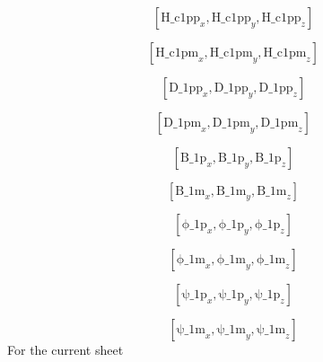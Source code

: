 \documentclass[fleqn]{article}
\begin{document}
\[\tag{\% o310} 
\left[ {{\ensuremath{\mathrm{H\_ c1pp}}}_x}\operatorname{,}{{\ensuremath{\mathrm{H\_ c1pp}}}_y}\operatorname{,}{{\ensuremath{\mathrm{H\_ c1pp}}}_z}\right] \mbox{}\]

\[\tag{\% o311} 
\left[ {{\ensuremath{\mathrm{H\_ c1pm}}}_x}\operatorname{,}{{\ensuremath{\mathrm{H\_ c1pm}}}_y}\operatorname{,}{{\ensuremath{\mathrm{H\_ c1pm}}}_z}\right] \mbox{}\]

\[\tag{\% o312} 
\left[ {{\ensuremath{\mathrm{D\_ 1pp}}}_x}\operatorname{,}{{\ensuremath{\mathrm{D\_ 1pp}}}_y}\operatorname{,}{{\ensuremath{\mathrm{D\_ 1pp}}}_z}\right] \mbox{}\]

\[\tag{\% o313} 
\left[ {{\ensuremath{\mathrm{D\_ 1pm}}}_x}\operatorname{,}{{\ensuremath{\mathrm{D\_ 1pm}}}_y}\operatorname{,}{{\ensuremath{\mathrm{D\_ 1pm}}}_z}\right] \mbox{}\]

\[\tag{\% o314} 
\left[ {{\ensuremath{\mathrm{B\_ 1p}}}_x}\operatorname{,}{{\ensuremath{\mathrm{B\_ 1p}}}_y}\operatorname{,}{{\ensuremath{\mathrm{B\_ 1p}}}_z}\right] \mbox{}\]

\[\tag{\% o315} 
\left[ {{\ensuremath{\mathrm{B\_ 1m}}}_x}\operatorname{,}{{\ensuremath{\mathrm{B\_ 1m}}}_y}\operatorname{,}{{\ensuremath{\mathrm{B\_ 1m}}}_z}\right] \mbox{}\]

\[\tag{\% o316} 
\left[ {{\ensuremath{\mathrm{\phi \_ 1p}}}_x}\operatorname{,}{{\ensuremath{\mathrm{\phi \_ 1p}}}_y}\operatorname{,}{{\ensuremath{\mathrm{\phi \_ 1p}}}_z}\right] \mbox{}\]

\[\tag{\% o317} 
\left[ {{\ensuremath{\mathrm{\phi \_ 1m}}}_x}\operatorname{,}{{\ensuremath{\mathrm{\phi \_ 1m}}}_y}\operatorname{,}{{\ensuremath{\mathrm{\phi \_ 1m}}}_z}\right] \mbox{}\]

\[\tag{\% o318} 
\left[ {{\ensuremath{\mathrm{\psi \_ 1p}}}_x}\operatorname{,}{{\ensuremath{\mathrm{\psi \_ 1p}}}_y}\operatorname{,}{{\ensuremath{\mathrm{\psi \_ 1p}}}_z}\right] \mbox{}\]

\[\tag{\% o319} 
\left[ {{\ensuremath{\mathrm{\psi \_ 1m}}}_x}\operatorname{,}{{\ensuremath{\mathrm{\psi \_ 1m}}}_y}\operatorname{,}{{\ensuremath{\mathrm{\psi \_ 1m}}}_z}\right] \mbox{}
\]
For the current sheet
\end{document}
